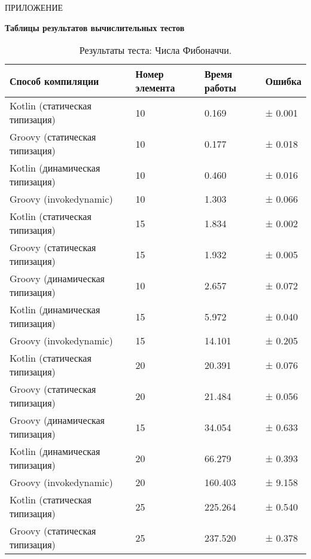 \vfill
\clearpage
\appendix


    \hfill ПРИЛОЖЕНИЕ 
    \begin{center}
        \bf{Таблицы результатов вычислительных тестов}
    \end{center}
    \markboth{\MakeUppercase{}}{}
    
    \begin{table}[h]
\caption{\label{tab:fibBenchResults}Результаты теста: Числа Фибоначчи.}
\begin{center}
\begin{tabular}{|l|p{}|l|l|}
\hline
Способ компиляции & Номер элемента & Время работы & Ошибка \\
\hline
Kotlin (статическая типизация)          & 10 &    0.169 & ±   0.001\\
Groovy (статическая типизация)          & 10 &    0.177 & ±   0.018\\
Kotlin (динамическая типизация)         & 10 &    0.460 & ±   0.016\\
Groovy (invokedynamic)                  & 10 &    1.303 & ±   0.066\\
Kotlin (статическая типизация)          & 15 &    1.834 & ±   0.002\\
Groovy (статическая типизация)          & 15 &    1.932 & ±   0.005\\
Groovy (динамическая типизация)         & 10 &    2.657 & ±   0.072\\
Kotlin (динамическая типизация)         & 15 &    5.972 & ±   0.040\\
Groovy (invokedynamic)                  & 15 &   14.101 & ±   0.205\\
Kotlin (статическая типизация)          & 20 &   20.391 & ±   0.076\\
Groovy (статическая типизация)          & 20 &   21.484 & ±   0.056\\
Groovy (динамическая типизация)         & 15 &   34.054 & ±   0.633\\
Kotlin (динамическая типизация)         & 20 &   66.279 & ±   0.393\\
Groovy (invokedynamic)                  & 20 &  160.403 & ±   9.158\\
Kotlin (статическая типизация)          & 25 &  225.264 & ±   0.540\\
Groovy (статическая типизация)          & 25 &  237.520 & ±   0.378\\

\end{tabular}
\end{center}
\end{table}
